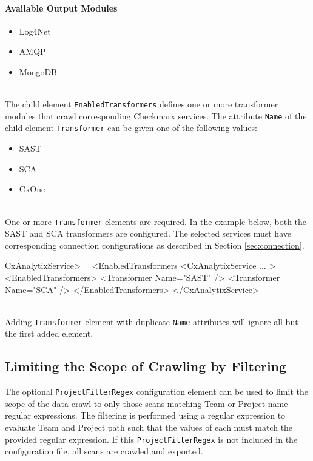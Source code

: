 \paragraph{Available Output Modules}\label{lst:outmodules}
\begin{itemize}
    \item Log4Net
    \item AMQP
    \item MongoDB
\end{itemize}

\noindent\\The child element \texttt{EnabledTransformers} defines one or more transformer modules that crawl corresponding Checkmarx services.  The
attribute \texttt{Name} of the child element \texttt{Transformer} can be given one of the following values:\\

\begin{itemize}
    \item SAST
    \item SCA
    \item CxOne
\end{itemize}

\noindent\\One or more \texttt{Transformer} elements are required.  In the example below, both the SAST and SCA transformers are configured.
The selected services must have corresponding connection configurations as described in Section \ref{sec:connection}.

\begin{xml}{CxAnalytixService> \ \faArrowLeft \ <EnabledTransformers}{}{}
<CxAnalytixService ... >
    <EnabledTransformers>
        <Transformer Name="SAST" />
        <Transformer Name="SCA" />
    </EnabledTransformers>
</CxAnalytixService>
\end{xml}

\noindent\\Adding \texttt{Transformer} element with duplicate \texttt{Name} attributes will ignore all but the first added element.

\subsection{Limiting the Scope of Crawling by Filtering}

The optional \texttt{ProjectFilterRegex} configuration element can be used to limit the scope of the data crawl to only those scans matching Team or Project
name regular expressions.  The filtering is performed using a regular expression to evaluate Team and Project path such that the values of each must
match the provided regular expression.  If this \texttt{ProjectFilterRegex} is not included in the configuration file, all scans are crawled and exported.


